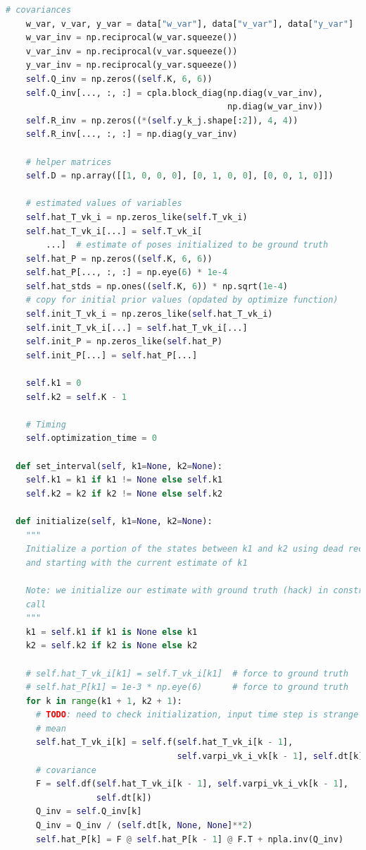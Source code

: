 \documentclass[a4paper]{article}
\begin{document}
\begin{lstlisting}[language=Python, basicstyle=\small, caption=main.py]
    # covariances
    w_var, v_var, y_var = data["w_var"], data["v_var"], data["y_var"]
    w_var_inv = np.reciprocal(w_var.squeeze())
    v_var_inv = np.reciprocal(v_var.squeeze())
    y_var_inv = np.reciprocal(y_var.squeeze())
    self.Q_inv = np.zeros((self.K, 6, 6))
    self.Q_inv[..., :, :] = cpla.block_diag(np.diag(v_var_inv),
                                            np.diag(w_var_inv))
    self.R_inv = np.zeros((*(self.y_k_j.shape[:2]), 4, 4))
    self.R_inv[..., :, :] = np.diag(y_var_inv)

    # helper matrices
    self.D = np.array([[1, 0, 0, 0], [0, 1, 0, 0], [0, 0, 1, 0]])

    # estimated values of variables
    self.hat_T_vk_i = np.zeros_like(self.T_vk_i)
    self.hat_T_vk_i[...] = self.T_vk_i[
        ...]  # estimate of poses initialized to be ground truth
    self.hat_P = np.zeros((self.K, 6, 6))
    self.hat_P[..., :, :] = np.eye(6) * 1e-4
    self.hat_stds = np.ones((self.K, 6)) * np.sqrt(1e-4)
    # copy for initial prior values (opdated by optimize function)
    self.init_T_vk_i = np.zeros_like(self.hat_T_vk_i)
    self.init_T_vk_i[...] = self.hat_T_vk_i[...]
    self.init_P = np.zeros_like(self.hat_P)
    self.init_P[...] = self.hat_P[...]

    self.k1 = 0
    self.k2 = self.K - 1

    # Timing
    self.optimization_time = 0

  def set_interval(self, k1=None, k2=None):
    self.k1 = k1 if k1 != None else self.k1
    self.k2 = k2 if k2 != None else self.k2

  def initialize(self, k1=None, k2=None):
    """
    Initialize a portion of the states between k1 and k2 using dead reckoning
    and starting with the current estimate of k1

    Note: we initialize our estimate with ground truth (hack) in constructor
    call
    """
    k1 = self.k1 if k1 is None else k1
    k2 = self.k2 if k2 is None else k2

    # self.hat_T_vk_i[k1] = self.T_vk_i[k1]  # force to ground truth
    # self.hat_P[k1] = 1e-3 * np.eye(6)      # force to ground truth
    for k in range(k1 + 1, k2 + 1):
      # TODO: need to check initialization, input time step is strange (but same as in assignment)
      # mean
      self.hat_T_vk_i[k] = self.f(self.hat_T_vk_i[k - 1],
                                  self.varpi_vk_i_vk[k - 1], self.dt[k])
      # covariance
      F = self.df(self.hat_T_vk_i[k - 1], self.varpi_vk_i_vk[k - 1],
                  self.dt[k])
      Q_inv = self.Q_inv[k]
      Q_inv = Q_inv / (self.dt[k, None, None]**2)
      self.hat_P[k] = F @ self.hat_P[k - 1] @ F.T + npla.inv(Q_inv)


\end{lstlisting}
\end{document}
